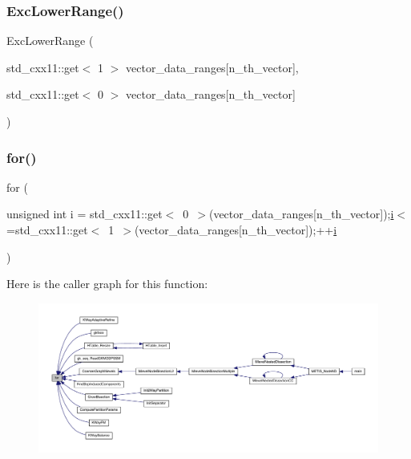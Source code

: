\mbox{\label{a00623_a4271ce0c289249580f95635786f05419}} 
\subsubsection{\texorpdfstring{Exc\+Lower\+Range()}{ExcLowerRange()}}
{\footnotesize\ttfamily Exc\+Lower\+Range (\begin{DoxyParamCaption}\item[{std\+\_\+cxx11\+::get$<$ 1 $>$}]{vector\+\_\+data\+\_\+ranges\mbox{[}n\+\_\+th\+\_\+vector\mbox{]},  }\item[{std\+\_\+cxx11\+::get$<$ 0 $>$}]{vector\+\_\+data\+\_\+ranges\mbox{[}n\+\_\+th\+\_\+vector\mbox{]} }\end{DoxyParamCaption})}

\mbox{\label{a00623_ad1e7380d51df1e0043d24d3c8a860e0a}} 
\subsubsection{\texorpdfstring{for()}{for()}}
{\footnotesize\ttfamily for (\begin{DoxyParamCaption}\item[{unsigned int}]{i = {\ttfamily std\+\_\+cxx11\+:\+:get$<$~0~$>$(vector\+\_\+data\+\_\+ranges\mbox{[}n\+\_\+th\+\_\+vector\mbox{]});\hyperlink{a00608_afb6aca53df96564f2adf086c942453ec}{i}$<$=std\+\_\+cxx11\+:\+:get$<$~1~$>$(vector\+\_\+data\+\_\+ranges\mbox{[}n\+\_\+th\+\_\+vector\mbox{]});++\hyperlink{a00608_afb6aca53df96564f2adf086c942453ec}{i}} }\end{DoxyParamCaption})}

Here is the caller graph for this function\+:\nopagebreak
\begin{figure}[H]
\begin{center}
\leavevmode
\includegraphics[width=350pt]{a00623_ad1e7380d51df1e0043d24d3c8a860e0a_icgraph}
\end{center}
\end{figure}
\mbox{\label{a00623_a934120182a1459d17613528940e2bc61}} 
